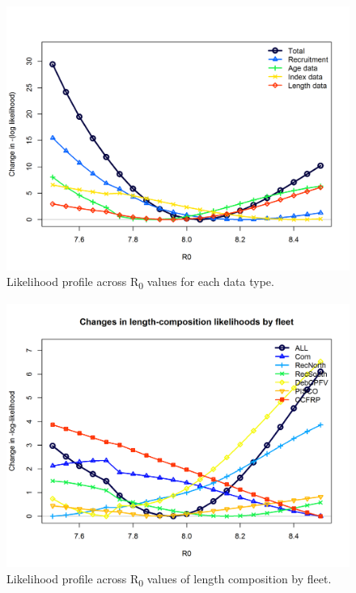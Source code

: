 \documentclass[12pt,]{article}
\begin{document}
\FloatBarrier

\begin{figure}
\centering
\includegraphics{Figures/profile_R0_like.png}
\caption{Likelihood profile across R\textsubscript{0} values for each
data type. \label{fig:profile_R0_like}}
\end{figure}

\FloatBarrier

\begin{figure}
\centering
\includegraphics{Figures/profile_R0_piner.png}
\caption{Likelihood profile across R\textsubscript{0} values of length
composition by fleet. \label{fig:profile_R0_piner}}
\end{figure}
\end{document}
